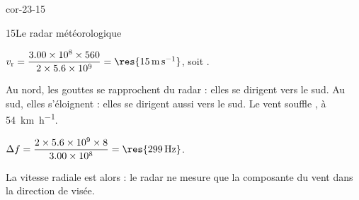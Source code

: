 \begin{blocLivre}{cor-23-15}
\begin{corrige}{15}{Le radar météorologique}
\begin{questions}
\item $v_\mathrm{r}=\dfrac{\num{3.00e8}\times560}{2\times\num{5.6e9}}=\res{\qty{15}{m.s^{-1}}}$, soit .
\item Au nord, les gouttes se rapprochent du radar : elles se dirigent vers le sud. Au sud, elles s'éloignent : elles se
dirigent aussi vers le sud. Le vent souffle , à \qty{54}{km.h^{-1}}.
\item $\Delta f=\dfrac{2\times\num{5.6e9}\times8}{\num{3.00e8}}=\res{\qty{299}{Hz}}$.
\item La vitesse radiale est alors  : le radar ne mesure que la composante du vent dans la direction de visée.
\end{questions}
\end{corrige}
\end{blocLivre}
